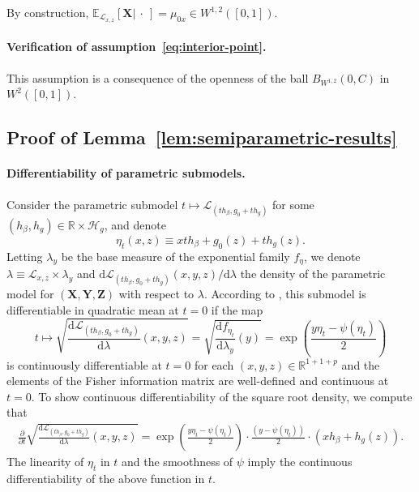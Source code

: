 \documentclass[aos]{imsart}
\theoremstyle{plain}
\theoremstyle{remark}
\newcommand{\E}{\mathbb E}								%
\newcommand{\R}{\mathbb{R}}								%
\newcommand{\prx}{\bm X}								%
\newcommand{\prz}{\bm Z}								%
\newcommand{\pry}{{\bm Y}}								%
\newcommand{\law}{\mathcal L}							%
\renewcommand{\H}{\mathcal H}		 					%
\begin{document}
By construction, $\E_{\law_{x,z}}[\prx |\ \cdot\ ] = \mu_{0x} \in W^{1,2}([0,1])$.

\paragraph*{Verification of assumption~\eqref{eq:interior-point}.} This assumption is a consequence of the openness of the ball $B_{W^{1,2}}(0, C)$ in $W^2([0,1])$.

\subsection{Proof of Lemma~\ref{lem:semiparametric-results}} \label{sec:proof-of-lemma-9}

\paragraph*{Differentiability of parametric submodels.}

Consider the parametric submodel $t \mapsto \law_{(th_\beta, g_0 + th_g)}$ for some $(h_\beta, h_g) \in \R \times \H_g$, and denote 
\begin{equation*}
\eta_t(x, z) \equiv x th_\beta+g_0(z)+th_g(z). 
\end{equation*}
Letting $\lambda_{y}$ be the base measure of the exponential family $f_\eta$, we denote $\lambda \equiv \law_{x,z} \times \lambda_{y}$ and $\mathrm d \law_{(th_\beta, g_0 + th_g)}(x, y, z)/\mathrm d \lambda$ the density of the parametric model for $(\prx, \pry, \prz)$ with respect to $\lambda$. According to \citet[Lemma 7.6]{VDV1998}, this submodel is differentiable in quadratic mean at $t = 0$ if the map 
\begin{equation*}
t \mapsto \sqrt{\frac{\mathrm d \law_{(th_\beta, g_0 + th_g)}}{\mathrm d\lambda}(x, y, z)} = \sqrt{\frac{\mathrm df_{\eta_t}}{\mathrm d\lambda_y}(y)} = \exp\left(\frac{y\eta_t-\psi(\eta_t)}{2}\right)
\end{equation*}
is continuously differentiable at $t = 0$ for each $(x,  y, z) \in \R^{1 + 1 + p}$ and the elements of the Fisher information matrix are well-defined and continuous at $t = 0$. To show continuous differentiability of the square root density, we compute that
\begin{align*}
	\frac{\partial}{\partial t}\sqrt{\frac{\mathrm d \law_{(th_\beta, g_0 + th_g)}}{\mathrm d\lambda}(x, y, z)} = \exp\left(\frac{y\eta_t-\psi(\eta_t)}{2}\right)\cdot\frac{(y-\dot{\psi}(\eta_t))}{2}\cdot (xh_\beta + h_g(z)).
\end{align*}
The linearity of $\eta_t$ in $t$ and the smoothness of $\psi$ imply the continuous differentiability of the above function in $t$.
\end{document}

